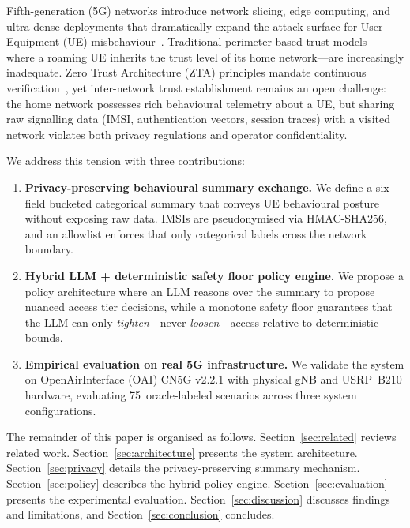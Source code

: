 \documentclass[conference]{IEEEtran}
\begin{document}
Fifth-generation (5G) networks introduce network slicing, edge computing, and ultra-dense deployments that dramatically expand the attack surface for User Equipment (UE) misbehaviour~\cite{ahmad2019security}. Traditional perimeter-based trust models---where a roaming UE inherits the trust level of its home network---are increasingly inadequate. Zero Trust Architecture (ZTA) principles mandate continuous verification~\cite{rose2020zero}, yet inter-network trust establishment remains an open challenge: the home network possesses rich behavioural telemetry about a UE, but sharing raw signalling data (IMSI, authentication vectors, session traces) with a visited network violates both privacy regulations and operator confidentiality.

We address this tension with three contributions:

\begin{enumerate}
    \item \textbf{Privacy-preserving behavioural summary exchange.} We define a six-field bucketed categorical summary that conveys UE behavioural posture without exposing raw data. IMSIs are pseudonymised via HMAC-SHA256, and an allowlist enforces that only categorical labels cross the network boundary.
    \item \textbf{Hybrid LLM + deterministic safety floor policy engine.} We propose a policy architecture where an LLM reasons over the summary to propose nuanced access tier decisions, while a monotone safety floor guarantees that the LLM can only \emph{tighten}---never \emph{loosen}---access relative to deterministic bounds.
    \item \textbf{Empirical evaluation on real 5G infrastructure.} We validate the system on OpenAirInterface (OAI) CN5G v2.2.1 with physical gNB and USRP~B210 hardware, evaluating 75~oracle-labeled scenarios across three system configurations.
\end{enumerate}

The remainder of this paper is organised as follows. Section~\ref{sec:related} reviews related work. Section~\ref{sec:architecture} presents the system architecture. Section~\ref{sec:privacy} details the privacy-preserving summary mechanism. Section~\ref{sec:policy} describes the hybrid policy engine. Section~\ref{sec:evaluation} presents the experimental evaluation. Section~\ref{sec:discussion} discusses findings and limitations, and Section~\ref{sec:conclusion} concludes.

\end{document}

